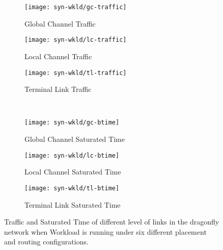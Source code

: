 \begin{figure*}[t]
    \centering
    \begin{subfigure}[t]{0.32\textwidth}
        \centering
        \texttt{[image: syn-wkld/gc-traffic]}
        \caption{Global Channel Traffic}
        \label{fig:synwkld-global-channel-traffic}
    \end{subfigure}\hfill
    \hspace{1em}%
    \begin{subfigure}[t]{0.32\textwidth}
        \centering
        \texttt{[image: syn-wkld/lc-traffic]}
        \caption{Local Channel Traffic}
        \label{fig:synwkld-local-channel-traffic}
    \end{subfigure}\hfill
    \hspace{1em}%
    \begin{subfigure}[t]{0.32\textwidth}
        \centering
        \texttt{[image: syn-wkld/tl-traffic]}
        \caption{Terminal Link Traffic}
        \label{fig:synwkld-terminal-link-traffic}
    \end{subfigure}\\

    \begin{subfigure}[t]{0.32\textwidth}
        \centering
        \texttt{[image: syn-wkld/gc-btime]}
        \caption{Global Channel Saturated Time}
        \label{fig:synwkld-global-channel-stime}
    \end{subfigure}\hfill
     \hspace{1em}%
    \begin{subfigure}[t]{0.32\textwidth}
        \centering
        \texttt{[image: syn-wkld/lc-btime]}
        \caption{Local Channel Saturated Time}
        \label{fig:synwkld-local-channel-stime}
    \end{subfigure}\hfill
    \hspace{1em}%
    \begin{subfigure}[t]{0.32\textwidth}
        \centering
        \texttt{[image: syn-wkld/tl-btime]}
        \caption{Terminal Link Saturated Time}
        \label{fig:synwkld-terminal-link-stime}
    \end{subfigure}%
   \caption{Traffic and Saturated Time of different level of links in the dragonfly network when Workload  is running under six different placement and routing configurations.}
   \label{fig:synwkld-network-traffic-stime}
\end{figure*}


